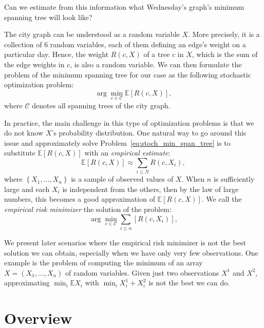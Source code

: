 Can we estimate from this information what Wednesday's graph's minimum spanning tree will look like?

The city graph can be understood as a random variable $X$. More precisely, it is a collection of 6 random variables, each of them defining an edge's weight on a particular day. Hence, the weight $R(c, X)$ of a tree $c$ in $X$, which is the sum of the edge weights in $c$, is also a random variable. We can then formulate the problem of the minimum spanning tree for our case as the following stochastic optimization problem:
%
\begin{equation}
\arg \min_{c \in \mathcal{C}} \mathbb{E}\left[R(c, X)\right],
\label{eq:stoch_min_span_tree}
\end{equation}
%
where $\mathcal{C}$ denotes all spanning trees of the city graph.

In practice, the main challenge in this type of optimization problems is that we do not know $X$'s probability distribution. One natural way to go around this issue and approximately solve Problem~\ref{eq:stoch_min_span_tree} is to substitute $\mathbb{E}\left[R(c, X)\right]$ with an \emph{empirical estimate}:
%
$$\mathbb{E}\left[R(c, X)\right] \approx \sum_{i \leq N} R(c, X_i),$$
%
where $\left\{X_1, \ldots, X_n\right\}$ is a sample of observed values of $X$. When $n$ is sufficiently large and each $X_i$ is independent from the others, then by the law of large numbers, this becomes a good approximation of $\mathbb{E}\left[R(c, X)\right]$. We call the \emph{empirical risk minimizer} the solution of the problem:
%
\begin{equation}
\arg \min_{c \in \mathcal{C}} \sum_{i \leq n}\left[R(c, X_i)\right],
\label{eq:erm}
\end{equation}

We present later scenarios where the empirical risk minimizer is not the best solution we can obtain, especially when we have only very few observations. One example is the problem of computing the minimum of an array $X = \left(X_1, \ldots, X_n\right)$ of random variables. Given just two observations $X^1$ and $X^2$, approximating $\min_i \mathbb{E}X_i$ with $\min_i X^1_i + X^2_i$ is not the best we can do.

\section{Overview}
%

